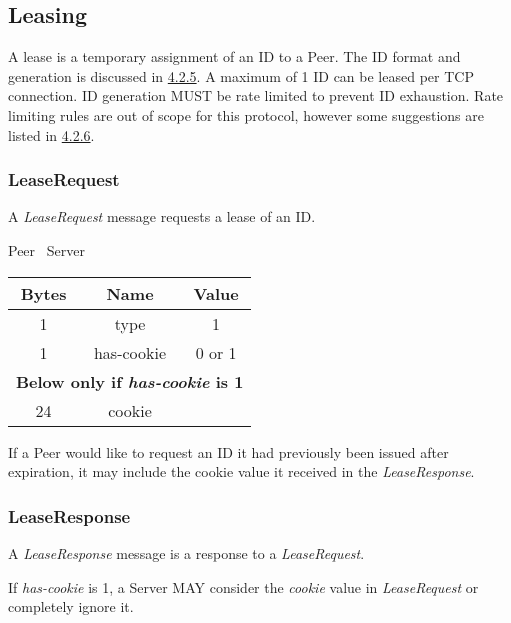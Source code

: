 \documentclass{article}
\begin{document}
    \subsection{Leasing}

    A lease is a temporary assignment of an ID to a Peer. The ID format and generation is discussed in
    \hyperlink{subsubsection.4.2.5}{4.2.5}. A maximum of 1 ID can be leased per TCP connection. ID generation MUST be
    rate limited to prevent ID exhaustion. Rate limiting rules are out of scope for this protocol, however some
    suggestions are listed in \hyperlink{subsubsection.4.2.6}{4.2.6}.

    \subsubsection{LeaseRequest}

    A \emph{LeaseRequest} message requests a lease of an ID.

    \begin{center}
        Peer \textrightarrow\ Server\\
        \begin{tabular}{|c|c|c|}
            \hline
            \textbf{Bytes} & \textbf{Name} & \textbf{Value} \\
            \hline
            1              & type          & 1              \\
            \hline
            1              & has-cookie    & 0 or 1         \\
            \hline
            \multicolumn{3}{|c|}{\textbf{Below only if \emph{has-cookie} is 1} } \\
            \hline
            24             & cookie        &                \\
            \hline
        \end{tabular}
    \end{center}

    If a Peer would like to request an ID it had previously been issued after expiration, it may include the cookie
    value it received in the \emph{LeaseResponse}.

    \subsubsection{LeaseResponse}

    A \emph{LeaseResponse} message is a response to a \emph{LeaseRequest}.

    If \emph{has-cookie} is 1, a Server MAY consider the \emph{cookie} value in \emph{LeaseRequest} or completely
    ignore it.
\end{document}
